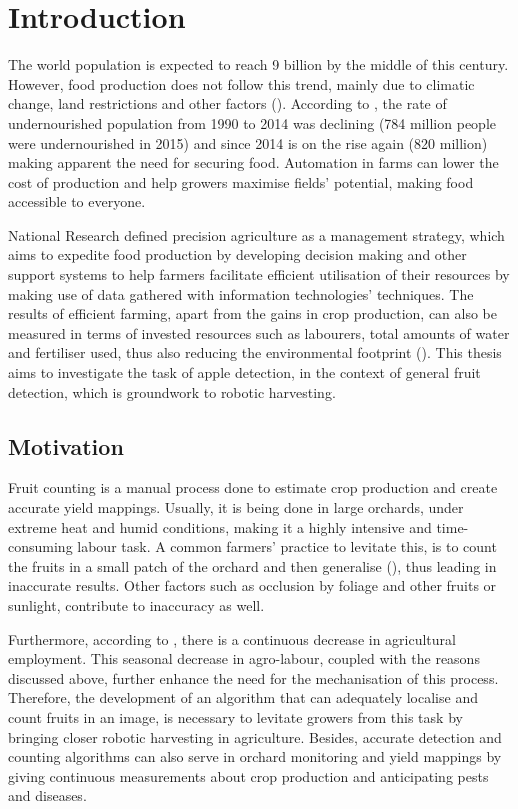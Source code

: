 \chapter{Introduction} \label{Chapter:Introduction}
The world population is expected to reach 9 billion by the middle of this century. However, food production does not follow this trend, mainly due to climatic change, land restrictions and other factors (\cite{godfray2010food}). According to \cite{mcguire2015fao}, the rate of undernourished population from 1990 to 2014 was declining (784 million people were undernourished in 2015) and since 2014 is on the rise again (820 million) making apparent the need for securing food. Automation in farms can lower the cost of production and help growers maximise fields' potential, making food accessible to everyone.

National Research \cite{NAP5491} defined precision agriculture as a management strategy, which aims to expedite food production by developing decision making and other support systems to help farmers facilitate efficient utilisation of their resources by making use of data gathered with information technologies' techniques. The results of efficient farming, apart from the gains in crop production, can also be measured in terms of invested resources such as labourers, total amounts of water and fertiliser used, thus also reducing the environmental footprint (\cite{zhang2012application}). This thesis aims to investigate the task of apple detection, in the context of general fruit detection, which is groundwork to robotic harvesting.

\section{Motivation}
Fruit counting is a manual process done to estimate crop production and create accurate yield mappings. Usually, it is being done in large orchards, under extreme heat and humid conditions, making it a highly intensive and time-consuming labour task. A common farmers' practice to levitate this, is to count the fruits in a small patch of the orchard and then generalise (\cite{bargoti2017fruit}), thus leading in inaccurate results. Other factors such as occlusion by foliage and other fruits or sunlight, contribute to inaccuracy as well.

Furthermore, according to \cite{agro_employment}, there is a continuous decrease in agricultural employment. This seasonal decrease in agro-labour, coupled with the reasons discussed above, further enhance the need for the mechanisation of this process. Therefore, the development of an algorithm that can adequately localise and count fruits in an image, is necessary to levitate growers from this task by bringing closer robotic harvesting in agriculture. Besides, accurate detection and counting algorithms can also serve in orchard monitoring and yield mappings by giving continuous measurements about crop production and anticipating pests and diseases.


